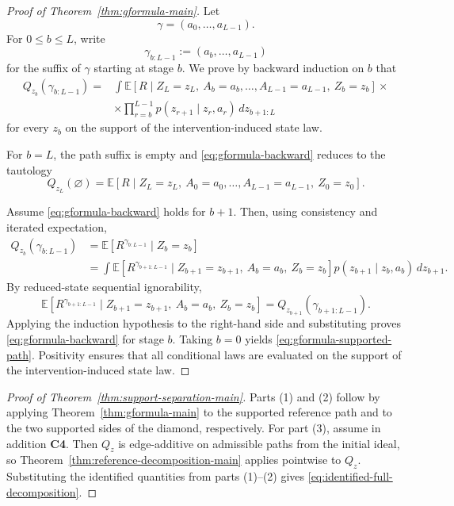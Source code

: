 \documentclass{article}
\theoremstyle{definition}
\newcommand{\EE}{\mathbb E}
\begin{document}
\begin{proof}[Proof of Theorem~\ref{thm:gformula-main}]
Let
\[
\gamma=(a_0,\dots,a_{L-1}).
\]
For \(0\le b\le L\), write
\[
\gamma_{b:L-1}:=(a_b,\dots,a_{L-1})
\]
for the suffix of \(\gamma\) starting at stage \(b\). We prove by backward induction on \(b\) that
\begin{align}
Q_{z_b}(\gamma_{b:L-1})
=
&\int
\EE\!\left[
R
\mid
Z_L=z_L,\ A_b=a_b,\dots,A_{L-1}=a_{L-1},\ Z_b=z_b
\right] \times\\
&\times
\prod_{r=b}^{L-1} p(z_{r+1}\mid z_r,a_r)\,dz_{b+1:L}
\label{eq:gformula-backward}
\end{align}
for every \(z_b\) on the support of the intervention-induced state law.

For \(b=L\), the path suffix is empty and \eqref{eq:gformula-backward} reduces to the tautology
\[
Q_{z_L}(\varnothing)=\EE[R\mid Z_L=z_L,\ A_0=a_0,\dots,A_{L-1}=a_{L-1},\ Z_0=z_0].
\]

Assume \eqref{eq:gformula-backward} holds for \(b+1\). Then, using consistency and iterated expectation,
\begin{align*}
Q_{z_b}(\gamma_{b:L-1})
&=
\EE\!\left[
R^{\gamma_{b:L-1}}
\mid Z_b=z_b
\right]\\
&=
\int
\EE\!\left[
R^{\gamma_{b+1:L-1}}
\mid Z_{b+1}=z_{b+1},\ A_b=a_b,\ Z_b=z_b
\right]
p(z_{b+1}\mid z_b,a_b)\,dz_{b+1}.
\end{align*}
By reduced-state sequential ignorability,
\[
\EE\!\left[
R^{\gamma_{b+1:L-1}}
\mid Z_{b+1}=z_{b+1},\ A_b=a_b,\ Z_b=z_b
\right]
=
Q_{z_{b+1}}(\gamma_{b+1:L-1}).
\]
Applying the induction hypothesis to the right-hand side and substituting proves \eqref{eq:gformula-backward} for stage \(b\). Taking \(b=0\) yields \eqref{eq:gformula-supported-path}. Positivity ensures that all conditional laws are evaluated on the support of the intervention-induced state law.
\end{proof}

\begin{proof}[Proof of Theorem~\ref{thm:support-separation-main}]
Parts (1) and (2) follow by applying Theorem~\ref{thm:gformula-main} to the supported reference path and to the two supported sides of the diamond, respectively. For part (3), assume in addition \textbf{C4}. Then \(Q_z\) is edge-additive on admissible paths from the initial ideal, so Theorem~\ref{thm:reference-decomposition-main} applies pointwise to \(Q_z\). Substituting the identified quantities from parts (1)--(2) gives \eqref{eq:identified-full-decomposition}.
\end{proof}
\end{document}
